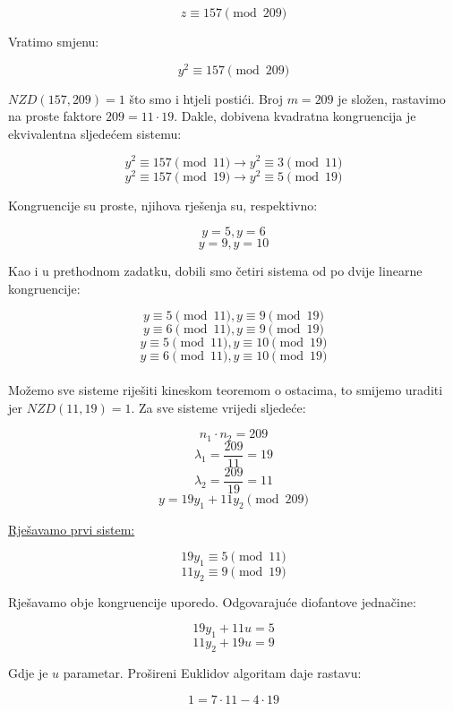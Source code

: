 \documentclass[12pt]{article}
\begin{document}
$$z \equiv 157 \pmod{209}$$\vspace{1mm}

Vratimo smjenu:

$$y^2 \equiv 157 \pmod{209}$$\vspace{1mm}

$NZD(157, 209) = 1$ što smo i htjeli postići. Broj $m = 209$ je složen, rastavimo na proste faktore $209 = 11 \cdot 19$. Dakle, dobivena kvadratna kongruencija je ekvivalentna sljedećem sistemu:

$$y^2 \equiv 157 \pmod{11} \to y^2 \equiv 3 \pmod{11}$$
$$y^2 \equiv 157 \pmod{19} \to y^2 \equiv 5 \pmod{19}$$\vspace{1mm}

Kongruencije su proste, njihova rješenja su, respektivno:

$$y = 5, y = 6$$
$$y = 9, y = 10$$\vspace{1mm}

Kao i u prethodnom zadatku, dobili smo četiri sistema od po dvije linearne kongruencije:

\[
y \equiv 5 \pmod{11}, y \equiv 9 \pmod{19} \label{eq:Z6eq1a} \tag{1}
\]
\[
y \equiv 6 \pmod{11}, y \equiv 9 \pmod{19} \label{eq:Z6eq1b} \tag{2}
\]
\[
y \equiv 5 \pmod{11}, y \equiv 10 \pmod{19} \label{eq:Z6eq1c} \tag{3}
\]
\[
y \equiv 6 \pmod{11}, y \equiv 10 \pmod{19} \label{eq:Z6eq1d} \tag{4}
\]
\\

Možemo sve sisteme riješiti kineskom teoremom o ostacima, to smijemo uraditi jer $NZD(11, 19) = 1$. Za sve sisteme vrijedi sljedeće:

$$n_{1} \cdot n_{2} = 209$$
$$\lambda_{1} = \frac{209}{11} = 19$$
$$\lambda_{2} = \frac{209}{19} = 11$$
$$y = 19y_{1} + 11y_{2} \pmod{209}$$\vspace{1mm}

\underline{Rješavamo prvi sistem:}

$$19y_{1} \equiv 5 \pmod{11}$$
$$11y_{2} \equiv 9 \pmod{19}$$\vspace{1mm}

Rješavamo obje kongruencije uporedo. Odgovarajuće diofantove jednačine:

$$19y_{1} + 11u = 5$$
$$11y_{2} + 19u = 9$$\vspace{1mm}

Gdje je $u$ parametar. Prošireni Euklidov algoritam daje rastavu:

$$1 = 7 \cdot 11 - 4 \cdot 19$$\vspace{1mm}
\end{document}
